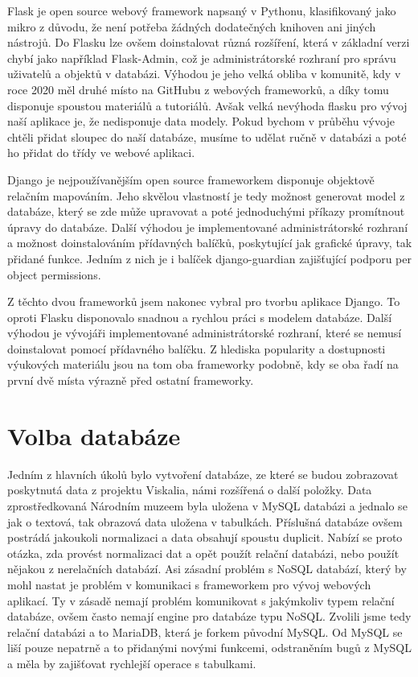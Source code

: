 Flask je open source webový framework napsaný v Pythonu, klasifikovaný
jako mikro z důvodu, že není potřeba žádných dodatečných knihoven ani
jiných nástrojů. Do Flasku lze ovšem doinstalovat různá rozšíření,
která v základní verzi chybí jako například Flask-Admin, což je
administrátorské rozhraní pro správu uživatelů a objektů v
databázi. Výhodou je jeho velká obliba v komunitě, kdy v roce 2020 měl
druhé místo na GitHubu z webových frameworků, a díky tomu disponuje
spoustou materiálů a tutoriálů. Avšak velká nevýhoda flasku pro vývoj
naší aplikace je, že nedisponuje data modely. Pokud bychom v průběhu
vývoje chtěli přidat sloupec do naší databáze, musíme to udělat ručně
v databázi a poté ho přidat do třídy ve webové aplikaci.

Django je nejpoužívanějším open source frameworkem disponuje objektově
relačním mapováním. Jeho skvělou vlastností je tedy možnost generovat
model z databáze, který se zde může upravovat a poté jednoduchými
příkazy promítnout úpravy do databáze. Další výhodou je implementované
administrátorské rozhraní a možnost doinstalováním přídavných balíčků,
poskytující jak grafické úpravy, tak přidané funkce. Jedním z nich je
i balíček django-guardian zajišťující podporu per object permissions.

Z těchto dvou frameworků jsem nakonec vybral pro tvorbu aplikace
Django. To oproti Flasku disponovalo snadnou a rychlou práci s modelem
databáze. Další výhodou je vývojáři implementované administrátorské
rozhraní, které se nemusí doinstalovat pomocí přídavného balíčku. Z
hlediska popularity a dostupnosti výukových materiálu jsou na tom oba
frameworky podobně, kdy se oba řadí na první dvě místa výrazně před
ostatní frameworky.

\vspace{10px}

\section{Volba databáze}

Jedním z hlavních úkolů bylo vytvoření databáze, ze které se budou
zobrazovat poskytnutá data z projektu Viskalia, námi rozšířená o další
položky. Data zprostředkovaná Národním muzeem byla uložena v MySQL
databázi a jednalo se jak o textová, tak obrazová data uložena v
tabulkách. Příslušná databáze ovšem postrádá jakoukoli normalizaci a
data obsahují spoustu duplicit. Nabízí se proto otázka, zda provést
normalizaci dat a opět použít relační databázi, nebo použít nějakou z
nerelačních databází. Asi zásadní problém s NoSQL databází, který by
mohl nastat je problém v komunikaci s frameworkem pro vývoj webových
aplikací. Ty v zásadě nemají problém komunikovat s jakýmkoliv typem
relační databáze, ovšem často nemají engine pro databáze typu
NoSQL. Zvolili jsme tedy relační databázi a to MariaDB, která je
forkem původní MySQL. Od MySQL se liší pouze nepatrně a to přidanými
novými funkcemi, odstraněním bugů z MySQL a měla by zajišťovat
rychlejší operace s tabulkami.

